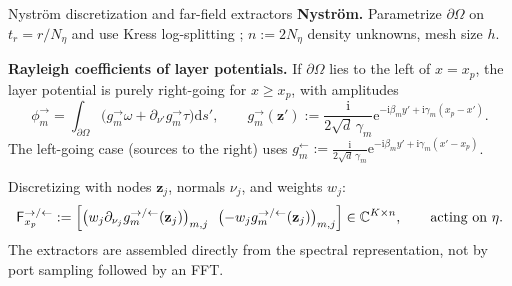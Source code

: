 \documentclass[aspectratio=169]{beamer}
\newcommand{\ii}{\mathrm{i}}
\newcommand{\ee}{\mathrm{e}}
\newcommand{\dd}{\mathrm{d}}
\newcommand{\CC}{\mathbb{C}}
\begin{document}
\begin{frame}{Nystr\"om discretization and far-field extractors}
  \small
  \textbf{Nystr\"om.} Parametrize $\partial\Omega$ on $t_r=r/N_\eta$ and use Kress
  log-splitting \cite{Kress1991,HaoBarnettMartinssonYoung2014}; $n:=2N_\eta$ density
  unknowns, mesh size $h$.

  \medskip
  \textbf{Rayleigh coefficients of layer potentials.} If $\partial\Omega$ lies to the
  left of $x=x_p$, the layer potential is purely right-going for $x\ge x_p$, with
  amplitudes
  \[
    \phi_m^{\rightarrow}=\int_{\partial\Omega}\bigl(g_m^{\rightarrow}\omega
      +\partial_{\nu'}g_m^{\rightarrow}\tau\bigr)\dd s',\qquad
    g_m^{\rightarrow}(\mathbf z'):=\frac{\ii}{2\sqrt d\,\gamma_m}
      \ee^{-\ii\beta_my'+\ii\gamma_m(x_p-x')}.
  \]
  The left-going case (sources to the right) uses
  $g_m^{\leftarrow}:=\frac{\ii}{2\sqrt d\,\gamma_m}\ee^{-\ii\beta_my'+\ii\gamma_m(x'-x_p)}$.

  \medskip
  Discretizing with nodes $\mathbf z_j$, normals $\nu_j$, and weights $w_j$:
  \[
    \mathsf F^{\rightarrow/\leftarrow}_{x_p}
    :=\Bigl[\bigl(w_j\partial_{\nu_j}g_m^{\rightarrow/\leftarrow}(\mathbf z_j)\bigr)_{m,j}\ \
      \bigl(-w_jg_m^{\rightarrow/\leftarrow}(\mathbf z_j)\bigr)_{m,j}\Bigr]\in\CC^{K\times n},
    \qquad\text{acting on }\eta.
  \]
  The extractors are assembled directly from the spectral representation, not by
  port sampling followed by an FFT.
\end{frame}
\end{document}
